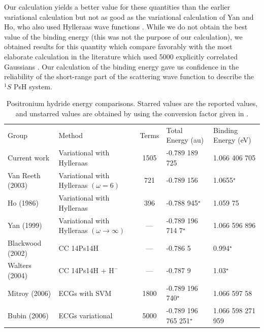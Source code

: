\documentclass[preprint,showpacs,preprintnumbers,amsmath,amssymb]{revtex4}
\begin{document}
Our calculation yields a better value for these
quantities than the earlier variational calculation \cite{VanReeth2003,VanReeth2004}
but not as good as the variational calculation of
Yan and Ho, who also used Hylleraas wave functions \cite{Yan1999}.
While we do not obtain the best value of the binding energy
(this was not the purpose of our calculation),
we obtained results for this quantity which compare favorably with
the most elaborate calculation in the literature which
used 5000 explicitly correlated Gaussians \cite{Bubin2006}.
Our calculation of the binding energy gave us confidence
in the reliability of the short-range part of the
scattering wave function to describe
the $^1S$ PsH system.


\squeezetable  %
\begin{table}[H]
\begin{center}
\begin{ruledtabular}  %
\begin{tabular}{l l c l l}
Group & Method & Terms & Total Energy (au) & Binding Energy (eV)\\
\colrule
Current work & Variational with Hylleraas & 1505 & -0.789 189 725 & 1.066 406 705 \\
Van Reeth (2003) \cite{VanReeth2003} & Variational with Hylleraas $(\omega = 6)$ & 721 & -0.789 156 & 1.0655$^\star$ \\
Ho (1986) \cite{Ho1986} & Variational with Hylleraas & 396 & -0.788 945$^\star$ & 1.059 75 \\
Yan (1999) \cite{Yan1999} & Variational with Hylleraas $(\omega \rightarrow \infty)$ & --- & -0.789 196 714 7$^\star$ & 1.066 596 896 \\
Blackwood (2002) \cite{Blackwood2002} & CC 14Ps14H & --- & -0.786 5 & 0.994$^\star$ \\
Walters (2004) \cite{Walters2004} & CC 14Ps14H + $\text{H}^-$ & --- & -0.787 9 & 1.03$^\star$\\
Mitroy (2006) \cite{Mitroy2006} & ECGs with SVM & 1800 & -0.789 196 740$^\star$ & 1.066 597 58 \\
Bubin (2006) \cite{Bubin2006} & ECGs variational & 5000 & -0.789 196 765 251$^\star$ & 1.066 598 271 959 \\
\end{tabular}
\end{ruledtabular}
\caption{Positronium hydride energy comparisons. Starred values are the reported values, and unstarred values are obtained by using the conversion factor given in \cite{NISTConversions}.}
\label{tab:BoundEnergy}
\end{center}
\end{table}
\end{document}
